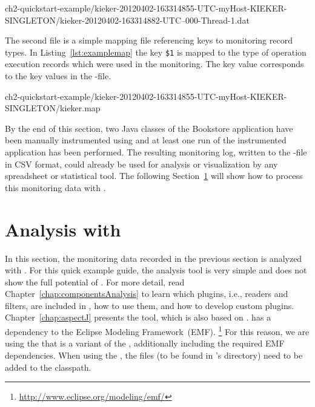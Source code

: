\setBashListing
%
{ch2-quickstart-example/kieker-20120402-163314855-UTC-myHost-KIEKER-SINGLETON/kieker-20120402-163314882-UTC--000-Thread-1.dat}

\noindent The second file is a simple mapping file referencing keys to monitoring record types. In Listing~\ref{lst:examplemap} the key \verb!$1! is mapped to the type of operation execution records which were used in the monitoring. The key value corresponds to the key values in the -file.

%
{ch2-quickstart-example/kieker-20120402-163314855-UTC-myHost-KIEKER-SINGLETON/kieker.map}

\noindent By the end of this section, two Java classes of the Bookstore application %
have been manually instrumented using \KiekerMonitoringPart{} and at least one %
run of the instrumented application has been performed. %
The resulting monitoring log, written to the -file in CSV format, could %
already be used for analysis or visualization by any spreadsheet or %
statistical tool. %
The following Section~\ref{sec:example:analysis} will show how to process %
this monitoring data with \KiekerAnalysisPart{}.

\section{Analysis with \KiekerAnalysisPart{}}\label{sec:example:analysis}

In this section, the monitoring data recorded in the previous section is %
analyzed with \KiekerAnalysisPart{}. %
For this quick example guide, the analysis tool is very simple and does not show %
the full potential of \Kieker{}. For more detail, read %
Chapter~\ref{chap:componentsAnalysis} to learn which plugins, i.e., readers %
and filters, are included in \Kieker{}, how to use them, and how to develop %
custom plugins. %
Chapter~\ref{chap:aspectJ} presents the \KiekerTraceAnalysis{} tool, which %
is also based on \KiekerAnalysisPart{}.
\KiekerAnalysisPart{} has a dependency to the Eclipse Modeling Framework~(EMF).%
\footnote{\url{http://www.eclipse.org/modeling/emf/}} %
For this reason, we are using the \file{\mainJarEMF{}} that is a variant of %
the \file{\mainJar{}}, additionally including the required EMF dependencies. %
When using the \file{\mainJar{}}, the  files (to %
be found in \Kieker's  directory) need to be added to the classpath. %

